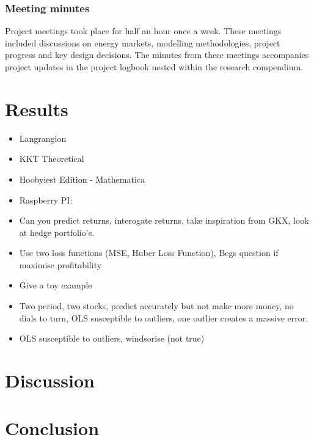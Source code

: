 \documentclass[12pt]{article}
\begin{document}
\subsubsection{Meeting minutes}
Project meetings took place for half an hour once a week. 
These meetings included discussions on energy markets, modelling methodologies, project progress and key design decisions.
The minutes from these meetings accompanies project updates in the project logbook nested within the research compendium.

\section{Results}
\begin{itemize}
	\item Langrangion
	\item KKT Theoretical
	\item Hoobyiest Edition - Mathematica
	\item Raspberry PI: 
	\item Can you predict returns, interogate returns, take inspiration from GKX, look at hedge portfolio's.
	\item Use two loss functions (MSE, Huber Loss Function), Begs question if maximise profitability
	\item Give a toy example
	\item Two period, two stocks, predict accurately but not make more money, no dials to turn, OLS susceptible to outliers, one outlier creates a massive error.
	\item OLS susceptible to outliers, windsorise (not true)
\end{itemize}
\section{Discussion}

\section{Conclusion}

\newpage
%
\newpage
\end{document}
